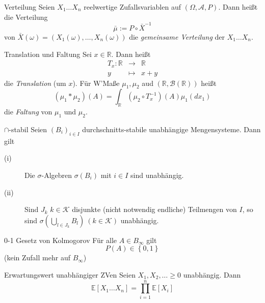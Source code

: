 \documentclass[avery5371,grid,frame]{flashcards} %
\begin{document}
\begin{flashcard}[Definition]{Verteilung}
  Seien $X_{1}\ldots X_{n}$ reelwertige Zufallsvariablen auf $\left(\Omega,\mathcal{A},P\right)$.
Dann heißt die Verteilung 
\[
\bar{\mu}:=P\circ\bar{X}^{-1}
\]
von $\bar{X}\left(\omega\right)=\left(X_{1}\left(\omega\right),\ldots,X_{n}\left(\omega\right)\right)$
die \emph{gemeinsame Verteilung} der
$X_{1}\ldots X_{n}$.
\end{flashcard}

\begin{flashcard}[Definition]{Translation und Faltung}
  Sei $x\in\mathbb{R}$. Dann heißt 
\begin{eqnarray*}
T_{x}:\mathbb{R} & \to & \mathbb{R}\\
y & \mapsto & x+y
\end{eqnarray*}
die \emph{Translation} (um $x$). Für W'Maße $\mu_{1},\mu_{2}$
aud $\left(\mathbb{R},\mathcal{B}\left(\mathbb{R}\right)\right)$
heißt 
\[
\left(\mu_{1}*\mu_{2}\right)\left(A\right)=\int_{\mathbb{R}}\left(\mu_{2}\circ T_{x}^{-1}\right)\left(A\right)\mu_{1}\left(dx_{1}\right)
\]
die \emph{Faltung} von $\mu_{1}$ und $\mu_{2}$.
\end{flashcard}

\begin{flashcard}[Satz]{$\cap$-stabil}
  Seien $\left(B_{i}\right)_{i\in I}$ durchschnitts-stabile unabhängige
Mengensysteme. Dann gilt
\begin{description}
\item [{(i)}] Die $\sigma$-Algebren $\sigma\left(B_{i}\right)$ mit $i\in I$
sind unabhängig.
\item [{(ii)}] Sind $J_{k}$ $k\in\mathcal{K}$ disjunkte (nicht notwendig
endliche) Teilmengen von $I$, so sind
$\sigma\left(\bigcup_{l\in J_{k}}B_{l}\right)\ \left(k\in\mathcal{K}\right)$
unabhängig. \label{s1.2(ii)}
\end{description}
\end{flashcard}

\begin{flashcard}[Satz]{0-1 Gesetz von Kolmogorov}
  Für alle $A\in B_{\infty}$ gilt
\[
P\left(A\right)\in\left\{ 0,1\right\} 
\]
(kein Zufall mehr auf $B_{\infty}$)
\end{flashcard}

\begin{flashcard}{Erwartungswert unabhängiger ZVen}
Seien $X_{1},X_{2},\ldots\geq0$ unabhängig. Dann 
\[
\mathbb{E}\left[X_{1}\ldots X_{n}\right]=\prod_{i=1}^{n}\mathbb{E}\left[X_{i}\right]
\]
\end{flashcard}
\end{document}
